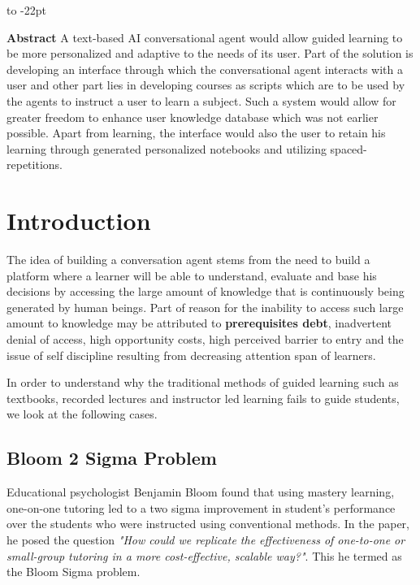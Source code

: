 \documentclass[]{article}
\makeatletter
\def\author#1{\gdef\@author{\hskip-\dimexpr(\tabcolsep)\hskip1pt\parbox{\dimexpr\textwidth-1pt}{\bfseries\raggedright \textit{#1}}}}
\def\title#1{\gdef\@title{\raggedright\bfseries\def\baselinestretch{1}\selectfont\selectfont#1}}
\renewenvironment{abstract}
{\hspace*{-15pc}\vspace*{-3.3pc}\vbox to -22pt \bgroup\begin{minipage}{1.7in}{\fontsize{8}{10}\selectfont\addtocontents{toc}{\protect\setcounter{tocdepth}{-1}}\tableofcontents\addtocontents{toc}{\protect\setcounter{tocdepth}{2}}}\vspace{1cm}\end{minipage}\egroup\vspace*{-.4pc}\trivlist\item[]\leftskip1pt\hfill\hfill\mbox{\null}\par\noindent\ignorespaces\color{black} }{\par\noindent\endtrivlist}
\makeatother
\begin{document}
\def\authorCount{0}
\def\affCount{0}

\def\journalTitle{White Paper- Primerlabs}

\title{An incremental approach for building a dialog based intelligent agent for guided learning.}
\author{Siddharth Kanungo}


\maketitle 
\def\RunningTitle{{An incremental approach for building a dialog based intelligent agent for guided learning.}}
\begin{abstract}
  \textbf{Abstract}
  A text-based AI conversational agent would allow guided learning to be more personalized and adaptive to the needs of its user. Part of the solution is developing an interface through which the conversational agent interacts with a user and other part lies in developing courses as scripts which are to be used by the agents to instruct a user to learn a subject. Such a system would allow for greater freedom to enhance user knowledge database which was not earlier possible. Apart from learning, the interface would also the user to retain his learning through generated personalized notebooks and utilizing spaced-repetitions.
\end{abstract}
    
\section{Introduction}

 The idea of building a conversation agent stems from the need to build a platform where a learner will be able to understand, evaluate and base his decisions by accessing the large amount of knowledge that is continuously being generated by human beings. Part of reason for the inability to access such large amount to knowledge may be attributed to \textbf{prerequisites debt}, inadvertent denial of access, high opportunity costs, high perceived barrier to entry and the issue of self discipline resulting from decreasing attention span of learners. 

In order to understand why the traditional methods of guided learning such as textbooks, recorded lectures and instructor led learning fails to guide students, we look at the following cases.
\subsection[Bloom 2 Sigma]{Bloom 2 Sigma Problem}
Educational psychologist Benjamin Bloom found\cite{doi:10.3102/0013189X013006004} that using mastery learning, one-on-one tutoring led to a two sigma improvement in student's performance over the students who were instructed using conventional methods.  In the paper, he posed the question \textit{"How could we replicate the effectiveness of one-to-one or small-group tutoring in a more cost-effective, scalable way?"}. This he termed as the Bloom Sigma problem.
\end{document}
